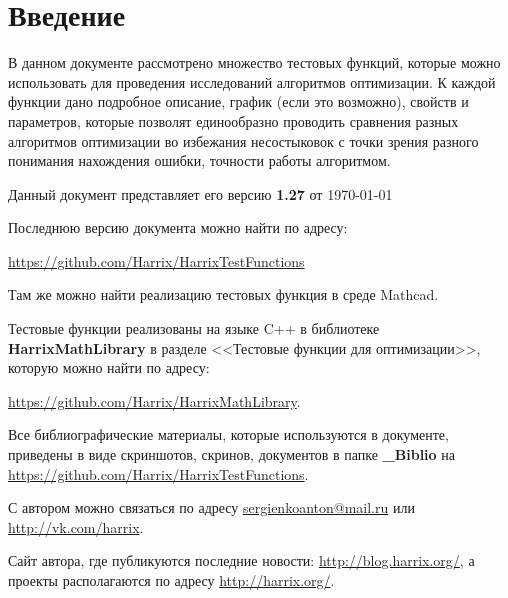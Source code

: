 \chapter*{Введение}

В данном документе рассмотрено множество тестовых функций, которые можно использовать для проведения исследований алгоритмов оптимизации. К каждой функции дано подробное описание, график (если это возможно), свойств и параметров, которые позволят единообразно проводить сравнения разных алгоритмов оптимизации во избежания несостыковок с точки зрения разного понимания нахождения ошибки, точности работы алгоритмом.

Данный документ представляет его версию \textbf{1.27} от \today

Последнюю версию документа можно найти по адресу:

\href{https://github.com/Harrix/HarrixTestFunctions}{https://github.com/Harrix/HarrixTestFunctions}

Там же можно найти реализацию тестовых функция в среде Mathcad.

Тестовые функции реализованы на языке C++ в библиотеке  \textbf{HarrixMathLibrary} в разделе <<Тестовые функции для оптимизации>>, которую можно найти по адресу:

\href{https://github.com/Harrix/HarrixMathLibrary} {https://github.com/Harrix/HarrixMathLibrary}.

Все библиографические материалы, которые используются в документе, приведены в виде скриншотов, скринов, документов в папке \textbf{\_Biblio} на \href{https://github.com/Harrix/HarrixTestFunctions}{https://github.com/Harrix/HarrixTestFunctions}.

С автором можно связаться по адресу \href{mailto:sergienkoanton@mail.ru}{sergienkoanton@mail.ru} или  \href{http://vk.com/harrix}{http://vk.com/harrix}.

Сайт автора, где публикуются последние новости: \href{http://blog.harrix.org/}{http://blog.harrix.org/}, а проекты располагаются по адресу \href{http://harrix.org/}{http://harrix.org/}.


\clearpage